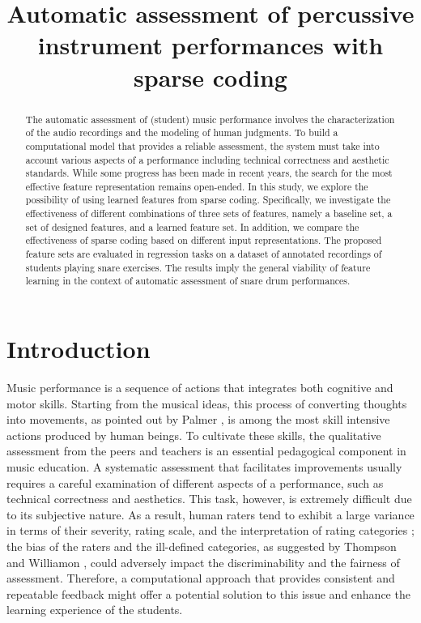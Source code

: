 \documentclass{article}
\title{Automatic assessment of percussive instrument performances with sparse coding}
\begin{document}
%
\maketitle
%
\begin{abstract}
The automatic assessment of (student) music performance involves the characterization of the audio recordings and the modeling of human judgments. To build a computational model that provides a reliable assessment, the system must take into account various aspects of a performance including technical correctness and aesthetic standards. While some progress has been made in recent years, the search for the most effective feature representation remains open-ended. In this study, we explore the possibility of using learned features from sparse coding. Specifically, we investigate the effectiveness of different combinations of three sets of features, namely a baseline set, a set of designed features, and a learned feature set. In addition, we compare the effectiveness of sparse coding based on different input representations. The proposed feature sets are evaluated in regression tasks on a dataset of annotated recordings of students playing snare exercises. The results imply the general viability of feature learning in the context of automatic assessment of snare drum performances.   
\end{abstract}
%
\section{Introduction}
Music performance is a sequence of actions that integrates both cognitive and motor skills. Starting from the musical ideas, this process of converting thoughts into movements, as pointed out by Palmer \cite{Palmer1997}, is among the most skill intensive actions produced by human beings. To cultivate these skills, the qualitative assessment from the peers and teachers is an essential pedagogical component in music education. A systematic assessment that facilitates improvements usually requires a careful examination of different aspects of a performance, such as technical correctness and aesthetics. This task, however, is extremely difficult due to its subjective nature. As a result, human raters tend to exhibit a large variance in terms of their severity, rating scale, and the interpretation of rating categories \cite{Wesolowski2016}; the bias of the raters and the ill-defined categories, as suggested by Thompson and Williamon \cite{Thompson2003}, could adversely impact the discriminability and the fairness of assessment. Therefore, a computational approach that provides consistent and repeatable feedback might offer a potential solution to this issue and enhance the learning experience of the students. 
\end{document}

